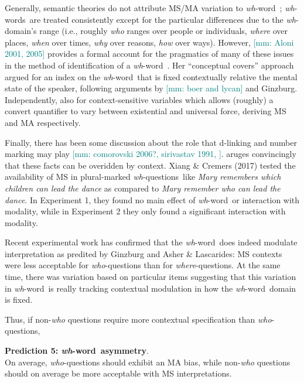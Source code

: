 \documentclass[12pt,letterpaper,table,svgnames,dvipsnames]{article}
\newcommand{\mm}[1]{\textcolor{teal}{[mm: #1]}}
\newcommand{\whqs}{\emph{wh}-questions~}
\newcommand{\whw}{\emph{wh}-word~}
\newcommand{\whws}{\emph{wh}-words~}
\begin{document}
Generally, semantic theories do not attribute MS/MA variation to \whw$\!$; \whws are treated consistently except for the particular differences due to the \emph{wh}-domain's range (i.e., roughly \emph{who} ranges over people or individuals, \emph{where} over places, \emph{when} over times, \emph{why} over reasons, \emph{how} over ways). However, \mm{Aloni 2001, 2005} provides a formal account for the pragmatics of many of these issues in the method of identification of a \whw. Her ``conceptual covers'' approach argued for an index on the \whw that is fixed contextually relative the mental state of the speaker, following arguments by \mm{boer and lycan} and Ginzburg. Independently,  also for context-sensitive variables which allows (roughly) a convert quantifier to vary between existential and universal force, deriving MS and MA respectively. 

Finally, there has been some discussion about the role that d-linking and number marking may play \cite{pesetsky1987,dayal1996,comorovski1996,xiang2016}\mm{comorovski 2006?, sirivastav 1991, }.  aruges convincingly that these facts can be overidden by context. Xiang \& Cremers (2017) tested the availability of MS in plural-marked \whqs like \emph{Mary remembers which children can lead the dance} as compared to \emph{Mary remember who can lead the dance}. In Experiment 1, they found no main effect of \whw or interaction with modality, while in Experiment 2 they only found a significant interaction with modality. 


Recent experimental work \cite{moyer2020,moyersyrett2019} has confirmed that the \whw does indeed modulate interpretation as predited by Ginzburg and Asher \& Lascarides: MS contexts were less acceptable for \emph{who}-questions than for \emph{where}-questions. At the same time, there was variation based on particular items suggesting that this variation in \whw is really tracking contextual modulation in how the \whw domain is fixed.

Thus, if non-\emph{who} questions require more contextual specification than \emph{who}-questions, 

\begin{tcolorbox}[colback=white]
\noindent \textbf{Prediction 5: \whw asymmetry}.\\
On average, \emph{who}-questions should exhibit an MA bias, while non-\emph{who} questions should on average be more acceptable with MS interpretations. 
\end{tcolorbox}
\end{document}
